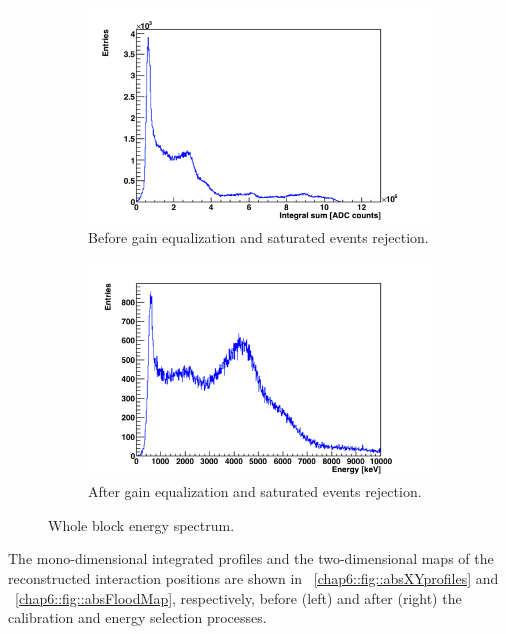 \begin{figure} [!h]
\begin{subfigure}[t]{0.5\textwidth}
\centering
\includegraphics[width=1\textwidth]{03_GraphicFiles/chapter6_BeamTests/Nice_September2018/287_noSel/raw_Espectrum.png}
\caption{Before gain equalization and saturated events rejection.}
\label{chap6::fig::absRaw_Espectrum}
\end{subfigure}
\begin{subfigure}[t]{0.5\textwidth}
\centering
\includegraphics[width=1\textwidth]{03_GraphicFiles/chapter6_BeamTests/Nice_September2018/287_noSel/2_Espectrum_canvas_cal.png}
\caption{After gain equalization and saturated events rejection.}
\label{chap6::fig::absCal_Espectrum}
\end{subfigure}
\caption{Whole block energy spectrum.}
\label{chap6::fig::absADCspectrum}
\end{figure}

The mono-dimensional integrated profiles and the two-dimensional maps of the reconstructed interaction positions are shown in \figurename~\ref{chap6::fig::absXYprofiles} and \figurename~\ref{chap6::fig::absFloodMap}, respectively, before (left) and after (right) the calibration and energy selection processes. 

